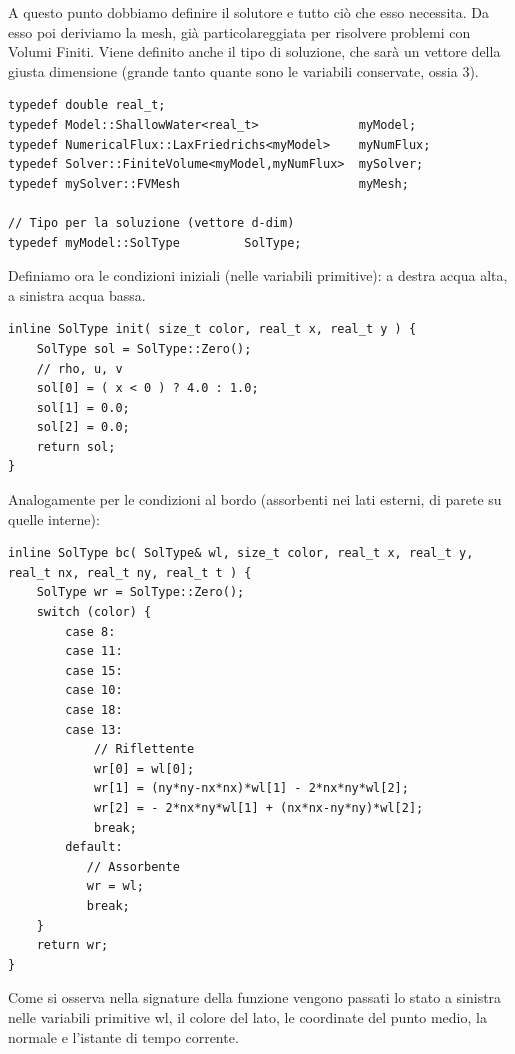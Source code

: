 A questo punto dobbiamo definire il solutore e tutto ciò che esso necessita. Da esso poi deriviamo la mesh, già particolareggiata per risolvere problemi con Volumi Finiti. Viene definito anche il tipo di soluzione, che sarà un vettore della giusta dimensione (grande tanto quante sono le variabili conservate, ossia 3). 
\begin{lstlisting}[name=dambreak2d]
typedef double real_t;
typedef Model::ShallowWater<real_t>              myModel;
typedef NumericalFlux::LaxFriedrichs<myModel>    myNumFlux;
typedef Solver::FiniteVolume<myModel,myNumFlux>  mySolver;
typedef mySolver::FVMesh                         myMesh;

// Tipo per la soluzione (vettore d-dim)
typedef myModel::SolType         SolType;
\end{lstlisting}
Definiamo ora le condizioni iniziali (nelle variabili primitive): a destra acqua alta, a sinistra acqua bassa.
\begin{lstlisting}[name=dambreak2d]
inline SolType init( size_t color, real_t x, real_t y ) {
    SolType sol = SolType::Zero();
    // rho, u, v
    sol[0] = ( x < 0 ) ? 4.0 : 1.0;
    sol[1] = 0.0;
    sol[2] = 0.0;
    return sol;
}
\end{lstlisting}
Analogamente per le condizioni al bordo (assorbenti nei lati esterni, di parete su quelle interne):
\begin{lstlisting}[name=dambreak2d]
inline SolType bc( SolType& wl, size_t color, real_t x, real_t y, real_t nx, real_t ny, real_t t ) {
    SolType wr = SolType::Zero();
    switch (color) {
        case 8:
        case 11:
        case 15:
        case 10:
        case 18:
        case 13:
            // Riflettente
            wr[0] = wl[0];
            wr[1] = (ny*ny-nx*nx)*wl[1] - 2*nx*ny*wl[2];
            wr[2] = - 2*nx*ny*wl[1] + (nx*nx-ny*ny)*wl[2];
            break;
        default:
           // Assorbente
           wr = wl;
           break;
    }
    return wr;
}
\end{lstlisting}
Come si osserva nella signature della funzione vengono passati lo stato a sinistra nelle variabili primitive wl, il colore del lato, le coordinate del punto medio, la normale e l'istante di tempo corrente.

